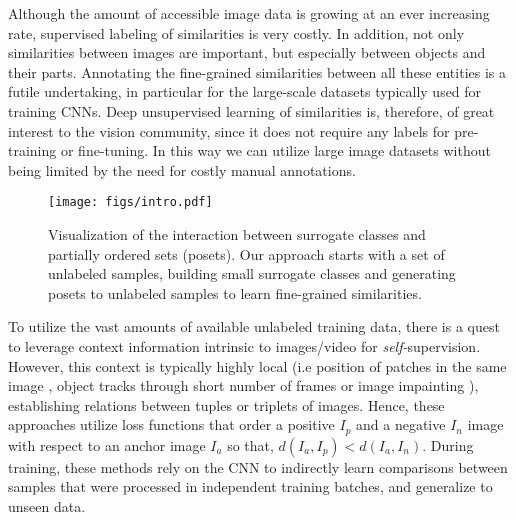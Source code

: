 \documentclass[10pt,twocolumn,letterpaper]{article}
\begin{document}
Although the amount of accessible image data is growing at an ever increasing rate, supervised labeling of similarities is very costly. In addition, not only similarities between images are important, but especially between objects and their parts.  Annotating the fine-grained similarities between all these entities is a futile undertaking, in particular for the large-scale datasets typically used for training CNNs. Deep unsupervised learning of similarities is, therefore, of great interest to the vision community, since it does not require any labels for pre-training or fine-tuning. In this way we can utilize large image datasets without being limited by the need for costly manual annotations.

\begin{figure}[!t]
\centering
\texttt{[image: figs/intro.pdf]}
\caption{Visualization of the interaction between surrogate classes and partially ordered sets (posets). Our approach starts with a set of unlabeled samples, building small surrogate classes and generating posets to unlabeled samples to learn fine-grained similarities.}
\label{fig:intro}
\end{figure}



To utilize the vast amounts of available unlabeled training data, there is a quest to leverage context information intrinsic to images/video for \textit{self-}supervision. However, this context is typically highly local (i.e position of patches in the same image \cite{ConvNetpretext1}, object tracks through short number of frames \cite{ConvNetpretext2} or image impainting \cite{impainting}), establishing relations between tuples \cite{ConvNetpretext1} or triplets \cite{shuffleandlearn,Yang_2016_CVPR,ConvNetpretext2} of images. Hence, these approaches utilize loss functions that order a positive $I_p$ and a negative $I_n$ image with respect to an anchor image $I_a$ so that, $d(I_a,I_p)<d(I_a,I_n)$. During training, these methods rely on the CNN to indirectly learn comparisons between samples that were processed in independent training batches, and generalize to unseen data.
\end{document}
